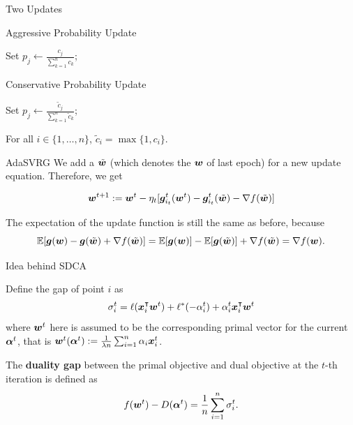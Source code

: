 \begin{frame}{Two Updates}
\begin{algorithm}[H]
    \label{alg:AggUpdate}
    \caption{Aggressive Probability Update}
    \SetAlgoLined
     {
	Set $p_j \leftarrow \frac{c_j}{\sum_{k=1}^n c_k}$;
    }
    \end{algorithm}
\begin{algorithm}[H]    
    \label{alg:ConUpdate}
    \caption{Conservative Probability Update}
    \SetAlgoLined
     {
	Set $p_j \leftarrow \frac{\tilde{c}_j}{\sum_{k=1}^n \tilde{c}_k}$;
    }
\end{algorithm} 
For all $i\in\{1,\dots,n\}$, $\tilde{c}_i = \max\{1, c_i\}$.
\end{frame}

\begin{frame}{AdaSVRG}
We add a $\tilde{\bm{w}}$ (which denotes the $\bm{w}$ of last epoch) for a new update equation. Therefore, we get

\begin{equation*}\label{eq:vr_w_update}
    \bm{w}^{t+1} := \bm{w}^{t}-\eta_t [\bm{g}_{i_t}^t(\bm{w}^{t}) - \bm{g}_{i_t}^t(\tilde{\bm{w}}) - \nabla f(\tilde{\bm{w}})]
\end{equation*}

The expectation of the update function is still the same as before, because
\[
    \mathbb{E}[\bm{g}(\bm{w}) - \bm{g}(\tilde{\bm{w}}) + \nabla f(\tilde{\bm{w}})] = \mathbb{E}[\bm{g}(\bm{w})] - \mathbb{E}[\bm{g}(\tilde{\bm{w}})] + \nabla f(\tilde{\bm{w}}) = \nabla f(\bm{w}).
\]
\end{frame}

\begin{frame}{Idea behind SDCA}
\begin{definition}{Define the gap of point $i$ as} 
\[
\sigma_i^t =  \ell(\bm{x}_i^\intercal\bm{w}^{t})+\ell^*(-\alpha_i^{t})+\alpha_i^{t}\bm{x}_i^\intercal\bm{w}^{t} 
\]
where $\bm{w}^t$ here is assumed to be the corresponding primal vector for the current $\bm{\alpha}^t$, that is $\bm{w}^t(\bm{\alpha}^t) := \frac{1}{\lambda n}\sum_{i=1}^n \alpha_i \bm{x}_i^t$.
\end{definition}

The \textbf{duality gap} between the primal objective and dual objective at the $t$-th iteration is defined as
\[
    f(\bm{w}^{t})-D(\bm{\alpha}^{t}) = \frac{1}{n} \sum_{i=1}^n \sigma_i^t.
\]
\end{frame}

